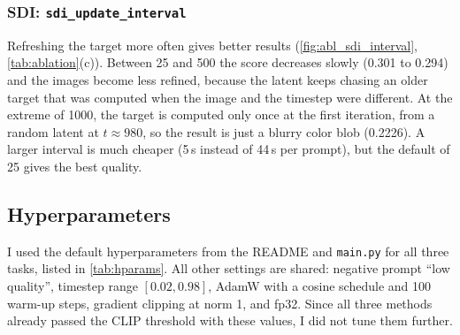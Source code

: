 \subsubsection{SDI: \texttt{sdi\_update\_interval}}
\label{sec:abl_sdi_interval}

Refreshing the target more often gives better results (\cref{fig:abl_sdi_interval}, \cref{tab:ablation}(c)).
Between 25 and 500 the score decreases slowly (0.301 to 0.294) and the images become less refined, because the latent keeps chasing an older target that was computed when the image and the timestep were different.
At the extreme of 1000, the target is computed only once at the first iteration, from a random latent at $t\approx980$, so the result is just a blurry color blob (0.2226).
A larger interval is much cheaper (5\,s instead of 44\,s per prompt), but the default of 25 gives the best quality.

\subsection{Hyperparameters}
\label{sec:hparams}



I used the default hyperparameters from the README and \texttt{main.py} for all three tasks, listed in \cref{tab:hparams}.
All other settings are shared: negative prompt ``low quality'', timestep range $[0.02, 0.98]$, AdamW with a cosine schedule and 100 warm-up steps, gradient clipping at norm 1, and fp32.
Since all three methods already passed the CLIP threshold with these values, I did not tune them further.
